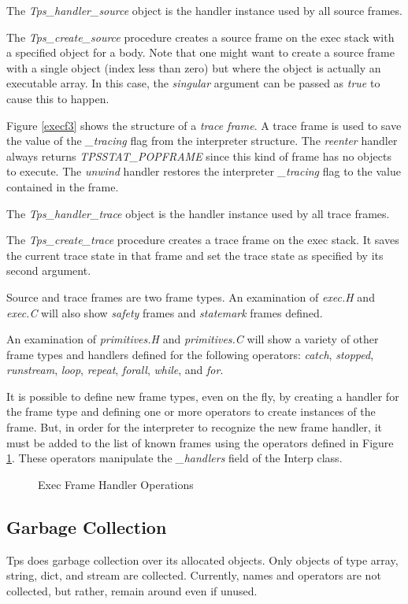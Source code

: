 The {\em Tps\_handler\_source} object is the
handler instance used by all source frames.

The {\em Tps\_create\_source} procedure
creates a source frame on the exec stack
with a specified object for a body.
Note that one might want to create a source frame
with a single object (index less than zero)
but where the object is actually an executable array.
In this case, the {\em singular} argument can be passed
as {\em true} to cause this to happen.

Figure \ref{execf3} shows the structure of a {\em trace frame}.
A trace frame is used to save the value of the {\em \_tracing}
flag from the interpreter structure.
The {\em reenter} handler always  returns {\em TPSSTAT\_POPFRAME}
since this kind of frame has no objects to execute.
The {\em unwind} handler restores the interpreter {\em \_tracing}
flag to the value contained in the frame.

The {\em Tps\_handler\_trace} object is the
handler instance used by all trace frames.

The {\em Tps\_create\_trace} procedure
creates a trace frame on the exec stack.
It saves the current trace state in that frame
and set the trace state as specified by its second argument.

Source and trace frames are two frame types.
An examination of
{\em exec.H} and {\em exec.C} will also show {\em safety} frames
and {\em statemark} frames defined.

An examination of
{\em primitives.H}
and
{\em primitives.C}
will show a variety of other frame types and handlers defined
for the following operators:
{\em catch},
{\em stopped},
{\em runstream},
{\em loop},
{\em repeat},
{\em forall},
{\em while},
and {\em for}.

It is possible to define new frame types, even on the fly,
by creating a handler for the frame type and defining
one or more operators to create instances of the frame.
But, in order for the interpreter to recognize
the new frame handler, it must be added to the list
of known frames using the operators defined
in Figure \ref{handops}.
These operators manipulate the {\em \_handlers}
field of the Interp class.
\begin{figure}[t]\centering

\caption{Exec Frame Handler Operations}
\label{handops}
\horizontalline
\end{figure}

\subsection{Garbage Collection}
\label{gc}
Tps does garbage collection over its allocated objects.
Only objects of type array, string, dict, and stream
are collected.  Currently, names and operators are not collected, but
rather, remain around even if unused.

